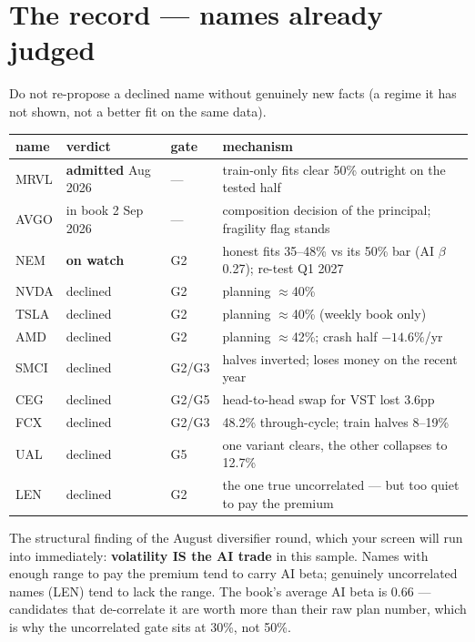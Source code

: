 \documentclass[11pt,a4paper]{article}
\newcommand{\tabnote}[1]{\begin{center}\begin{minipage}{0.92\textwidth}
  \footnotesize\color{bcgrey}#1\end{minipage}\end{center}}
\begin{document}
\section{The record --- names already judged}

Do not re-propose a declined name without genuinely new facts (a regime it has
not shown, not a better fit on the same data).

\begin{center}
\begin{tabular}{llll}
\toprule
name & verdict & gate & mechanism \\
\midrule
MRVL & \textbf{admitted} Aug 2026 & --- & train-only fits clear 50\% outright on the tested half \\
AVGO & in book 2 Sep 2026 & --- & composition decision of the principal; fragility flag stands \\
NEM  & \textbf{on watch} & G2 & honest fits 35--48\% vs its 50\% bar (AI $\beta$ 0.27); re-test Q1 2027 \\
NVDA & declined & G2 & planning $\approx$40\% \\
TSLA & declined & G2 & planning $\approx$40\% (weekly book only) \\
AMD  & declined & G2 & planning $\approx$42\%; crash half $-14.6\%$/yr \\
SMCI & declined & G2/G3 & halves inverted; loses money on the recent year \\
CEG  & declined & G2/G5 & head-to-head swap for VST lost 3.6pp \\
FCX  & declined & G2/G3 & 48.2\% through-cycle; train halves 8--19\% \\
UAL  & declined & G5 & one variant clears, the other collapses to 12.7\% \\
LEN  & declined & G2 & the one true uncorrelated --- but too quiet to pay the premium \\
\bottomrule
\end{tabular}
\end{center}

\tabnote{The structural finding of the August diversifier round, which your
screen will run into immediately: \textbf{volatility IS the AI trade} in this
sample. Names with enough range to pay the premium tend to carry AI beta;
genuinely uncorrelated names (LEN) tend to lack the range. The book's average
AI beta is 0.66 --- candidates that de-correlate it are worth more than their
raw plan number, which is why the uncorrelated gate sits at 30\%, not 50\%.}
\end{document}
